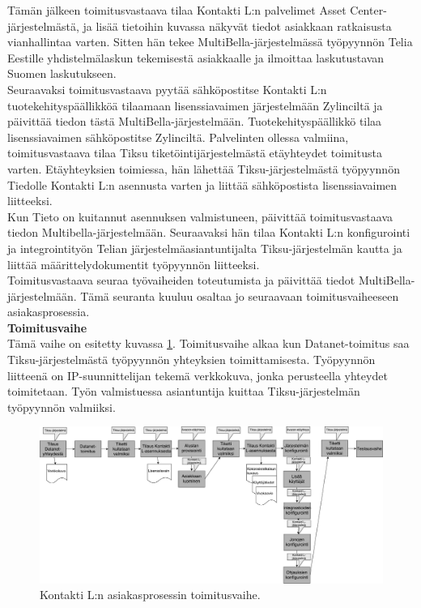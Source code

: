 \documentclass[finnish,12pt,a4paper,pdftex]{article}
\begin{document}
Tämän jälkeen toimitusvastaava tilaa Kontakti L:n palvelimet Asset Center-järjestelmästä, ja lisää tietoihin kuvassa näkyvät tiedot asiakkaan ratkaisusta vianhallintaa varten. Sitten hän tekee MultiBella-järjestelmässä työpyynnön Telia Eestille yhdistelmälaskun tekemisestä asiakkaalle ja ilmoittaa laskutustavan Suomen laskutukseen.\\

Seuraavaksi toimitusvastaava pyytää sähköpostitse Kontakti L:n tuotekehityspäällikköä tilaamaan lisenssiavaimen järjestelmään Zylinciltä ja päivittää tiedon tästä MultiBella-järjestelmään. Tuotekehityspäällikkö tilaa lisenssiavaimen sähköpostitse Zylinciltä. Palvelinten ollessa valmiina, toimitusvastaava tilaa Tiksu tiketöintijärjestelmästä etäyhteydet toimitusta varten. Etäyhteyksien toimiessa, hän lähettää Tiksu-järjestelmästä työpyynnön Tiedolle Kontakti L:n asennusta varten ja liittää sähköpostista lisenssiavaimen liitteeksi.\\

Kun Tieto on kuitannut asennuksen valmistuneen, päivittää toimitusvastaava tiedon Multibella-järjestelmään. Seuraavaksi hän tilaa Kontakti L:n konfigurointi ja integrointityön Telian järjestelmäasiantuntijalta Tiksu-järjestelmän kautta ja liittää määrittelydokumentit työpyynnön liitteeksi.\\

Toimitusvastaava seuraa työvaiheiden toteutumista ja päivittää tiedot MultiBella-järjestelmään. Tämä seuranta kuuluu osaltaa jo seuraavaan toimitusvaiheeseen asiakasprosessia.\\

\textbf{Toimitusvaihe}\\


Tämä vaihe on esitetty kuvassa \ref{fig:toimitus}. Toimitusvaihe alkaa kun Datanet-toimitus saa Tiksu-järjestelmästä työpyynnön yhteyksien toimittamisesta. Työpyynnön liitteenä on IP-suunnittelijan tekemä verkkokuva, jonka perusteella yhteydet toimitetaan. Työn valmistuessa asiantuntija kuittaa Tiksu-järjestelmän työpyynnön valmiiksi.\\

\begin{figure}[!h]
    \centering
    \includegraphics[scale=0.3]{images/toimitus.pdf}
    \caption{Kontakti L:n asiakasprosessin toimitusvaihe.}
    \label{fig:toimitus}
\end{figure}
\end{document}
